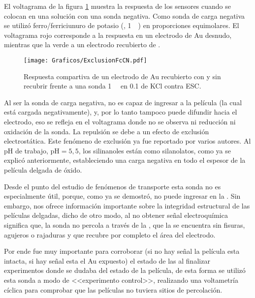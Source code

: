 	El voltagrama de la figura \ref{fig:exclusion_vs_Au} muestra la respuesta de los sensores cuando se colocan en una solución con una sonda negativa. Como sonda de carga negativa se utilizó ferro/ferriciunuro de potasio (\ferroferri, \SI{1}{\milli\Molar}) en proporciones equimolares. El voltagrama rojo corresponde a la respuesta en un electrodo de Au desnudo, mientras que la verde a un electrodo recubierto de \pdm.
	
			\begin{figure}[ht]
				\centering
		 	    \texttt{[image: Graficos/ExclusionFcCN.pdf]}
		        \caption[Exclusión electrostática]{Respuesta compartiva de un electrodo de Au recubierto con \pdmF\space y sin recubrir frente a una sonda \ferroferri \SI{1}{\milli\Molar} en \SI{0.1}{\Molar} de KCl contra ESC.}
		        \label{fig:exclusion_vs_Au}
		      	\end{figure}
	
	 Al ser la sonda de carga negativa, no es capaz de ingresar a la película (la cual está cargada negativamente), y, por lo tanto tampoco puede difundir hacia el electrodo, eso se refleja en el voltagrama donde no se observa ni reducción ni oxidación de la sonda. La repulsión se debe a un efecto de exclusión electrostática. Este fenómeno de exclusión ya fue reportado por varios autores\cite{alberti2015,schmuhl2005,Andrieu-Brunsen2015,brunsen2011}. Al pH de trabajo, $\text{pH}=5,5$, los silinanoles están como silanolatos, como ya se explicó anteriormente, estableciendo una carga negativa en todo el espesor de la película delgada de óxido.

	 Desde el punto del estudio de fenómenos de  transporte esta sonda no es especialmente útil, porque, como ya se demostró, no puede ingresar en la \pdm. Sin embargo, nos ofrece información importante sobre la integridad estructural de las películas delgadas, dicho de otro modo, al no obtener señal electroquímica significa que, la sonda no percola a través de la \pdm\space, que la \pdm\space se encuentra sin fisuras, agujeros o rajaduras y que recubre por completo el área del electrodo.

	 Por ende fue muy importante para corroborar (si no hay señal la película esta intacta, si hay señal esta el Au expuesto) el estado de las \pdm\space al finalizar experimentos donde se dudaba del estado de la película, de esta forma se utilizó esta sonda a modo de <<experimento control>>, realizando una voltametría cíclica para comprobar que las películas no tuviera sitios de percolación.

